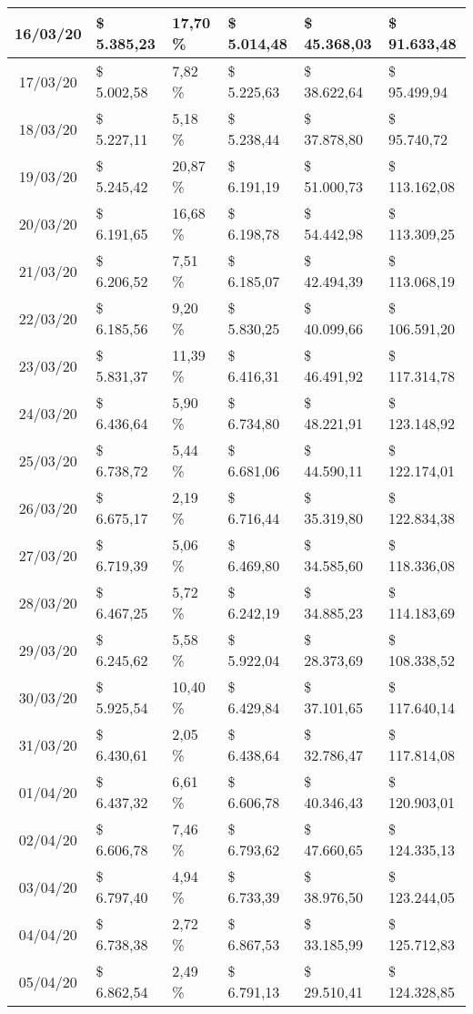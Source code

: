 \begin{small}
\begin{longtable}{|c|l|l|l|l|l|}
16/03/20 & \$ 5.385,23 & 17,70 \% & \$ 5.014,48 & \$ 45.368,03 & \$ 91.633,48 \\ \hline
17/03/20 & \$ 5.002,58 & 7,82 \% & \$ 5.225,63 & \$ 38.622,64 & \$ 95.499,94 \\ \hline
18/03/20 & \$ 5.227,11 & 5,18 \% & \$ 5.238,44 & \$ 37.878,80 & \$ 95.740,72 \\ \hline
19/03/20 & \$ 5.245,42 & 20,87 \% & \$ 6.191,19 & \$ 51.000,73 & \$ 113.162,08 \\ \hline
20/03/20 & \$ 6.191,65 & 16,68 \% & \$ 6.198,78 & \$ 54.442,98 & \$ 113.309,25 \\ \hline
21/03/20 & \$ 6.206,52 & 7,51 \% & \$ 6.185,07 & \$ 42.494,39 & \$ 113.068,19 \\ \hline
22/03/20 & \$ 6.185,56 & 9,20 \% & \$ 5.830,25 & \$ 40.099,66 & \$ 106.591,20 \\ \hline
23/03/20 & \$ 5.831,37 & 11,39 \% & \$ 6.416,31 & \$ 46.491,92 & \$ 117.314,78 \\ \hline
24/03/20 & \$ 6.436,64 & 5,90 \% & \$ 6.734,80 & \$ 48.221,91 & \$ 123.148,92 \\ \hline
25/03/20 & \$ 6.738,72 & 5,44 \% & \$ 6.681,06 & \$ 44.590,11 & \$ 122.174,01 \\ \hline
26/03/20 & \$ 6.675,17 & 2,19 \% & \$ 6.716,44 & \$ 35.319,80 & \$ 122.834,38 \\ \hline
27/03/20 & \$ 6.719,39 & 5,06 \% & \$ 6.469,80 & \$ 34.585,60 & \$ 118.336,08 \\ \hline
28/03/20 & \$ 6.467,25 & 5,72 \% & \$ 6.242,19 & \$ 34.885,23 & \$ 114.183,69 \\ \hline
29/03/20 & \$ 6.245,62 & 5,58 \% & \$ 5.922,04 & \$ 28.373,69 & \$ 108.338,52 \\ \hline
30/03/20 & \$ 5.925,54 & 10,40 \% & \$ 6.429,84 & \$ 37.101,65 & \$ 117.640,14 \\ \hline
31/03/20 & \$ 6.430,61 & 2,05 \% & \$ 6.438,64 & \$ 32.786,47 & \$ 117.814,08 \\ \hline
01/04/20 & \$ 6.437,32 & 6,61 \% & \$ 6.606,78 & \$ 40.346,43 & \$ 120.903,01 \\ \hline
02/04/20 & \$ 6.606,78 & 7,46 \% & \$ 6.793,62 & \$ 47.660,65 & \$ 124.335,13 \\ \hline
03/04/20 & \$ 6.797,40 & 4,94 \% & \$ 6.733,39 & \$ 38.976,50 & \$ 123.244,05 \\ \hline
04/04/20 & \$ 6.738,38 & 2,72 \% & \$ 6.867,53 & \$ 33.185,99 & \$ 125.712,83 \\ \hline
05/04/20 & \$ 6.862,54 & 2,49 \% & \$ 6.791,13 & \$ 29.510,41 & \$ 124.328,85 \\ \hline

\end{longtable}
\end{small}
